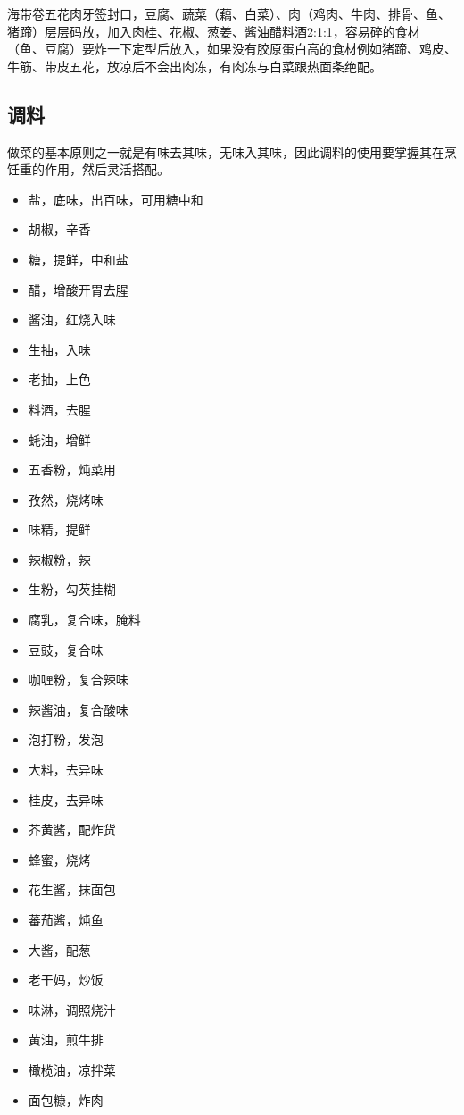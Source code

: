 \documentclass[
  letterpaper,
  DIV=11,
  numbers=noendperiod]{scrreprt}
\providecommand{\tightlist}{%
  \setlength{\itemsep}{0pt}\setlength{\parskip}{0pt}}\usepackage{longtable,booktabs,array}
\begin{document}
海带卷五花肉牙签封口，豆腐、蔬菜（藕、白菜）、肉（鸡肉、牛肉、排骨、鱼、猪蹄）层层码放，加入肉桂、花椒、葱姜、酱油醋料酒2:1:1，容易碎的食材（鱼、豆腐）要炸一下定型后放入，如果没有胶原蛋白高的食材例如猪蹄、鸡皮、牛筋、带皮五花，放凉后不会出肉冻，有肉冻与白菜跟热面条绝配。

\subsection{调料}\label{ux8c03ux6599}

做菜的基本原则之一就是有味去其味，无味入其味，因此调料的使用要掌握其在烹饪重的作用，然后灵活搭配。

\begin{itemize}
\tightlist
\item
  盐，底味，出百味，可用糖中和
\item
  胡椒，辛香
\item
  糖，提鲜，中和盐
\item
  醋，增酸开胃去腥
\item
  酱油，红烧入味
\item
  生抽，入味
\item
  老抽，上色
\item
  料酒，去腥
\item
  蚝油，增鲜
\item
  五香粉，炖菜用
\item
  孜然，烧烤味
\item
  味精，提鲜
\item
  辣椒粉，辣
\item
  生粉，勾芡挂糊
\item
  腐乳，复合味，腌料
\item
  豆豉，复合味
\item
  咖喱粉，复合辣味
\item
  辣酱油，复合酸味
\item
  泡打粉，发泡
\item
  大料，去异味
\item
  桂皮，去异味
\item
  芥黄酱，配炸货
\item
  蜂蜜，烧烤
\item
  花生酱，抹面包
\item
  蕃茄酱，炖鱼
\item
  大酱，配葱
\item
  老干妈，炒饭
\item
  味淋，调照烧汁
\item
  黄油，煎牛排
\item
  橄榄油，凉拌菜
\item
  面包糠，炸肉
\end{itemize}
\end{document}
